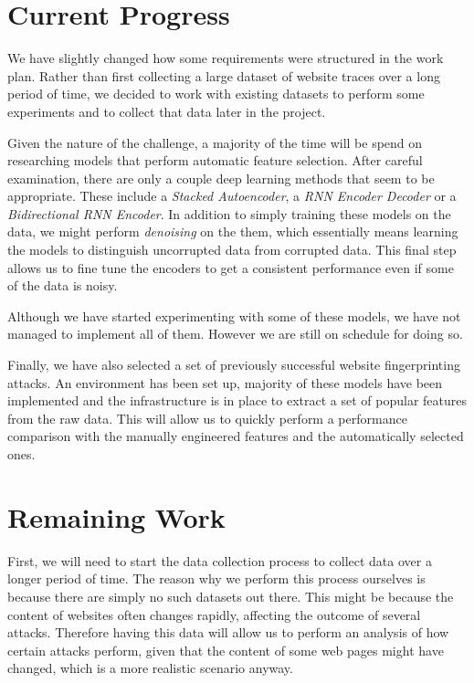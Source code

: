 \documentclass[10pt,a4paper]{article}
\begin{document}


\section{Current Progress}
We have slightly changed how some requirements were structured in the work plan.
Rather than first collecting a large dataset of website traces over a long period of time,
we decided to work with existing datasets to perform some experiments and to collect that data later in the project.

Given the nature of the challenge, a majority of the time will be spend on researching models that perform automatic feature selection.
After careful examination, there are only a couple deep learning methods that seem to be appropriate.
These include a \textit{Stacked Autoencoder}, a \textit{RNN Encoder Decoder} or a \textit{Bidirectional RNN Encoder}.
In addition to simply training these models on the data, we might perform \textit{denoising} on the them, which essentially means learning the models to distinguish uncorrupted data from corrupted data.
This final step allows us to fine tune the encoders to get a consistent performance even if some of the data is noisy.

Although we have started experimenting with some of these models, we have not managed to implement all of them.
However we are still on schedule for doing so.

Finally, we have also selected a set of previously successful website fingerprinting attacks.
An environment has been set up, majority of these models have been implemented and the infrastructure is in place to extract a set of popular features from the raw data.
This will allow us to quickly perform a performance comparison with the manually engineered features and the automatically selected ones.


\section{Remaining Work}
First, we will need to start the data collection process to collect data over a longer period of time.
The reason why we perform this process ourselves is because there are simply no such datasets out there.
This might be because the content of websites often changes rapidly, affecting the outcome of several attacks.
Therefore having this data will allow us to perform an analysis of how certain attacks perform, given that the content of some web pages might have changed, which is a more realistic scenario anyway.
\end{document}
